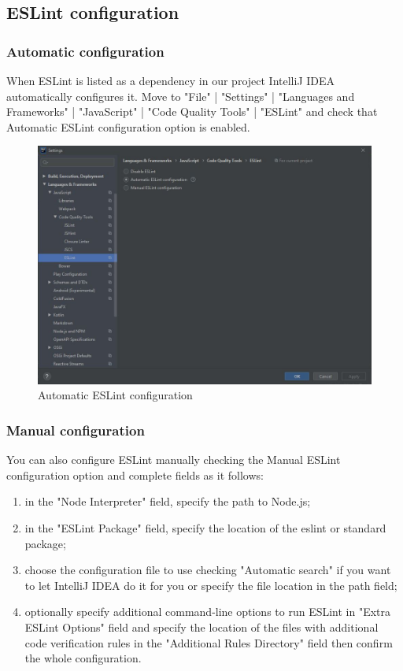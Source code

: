 	\subsection{ESLint configuration}
		\subsubsection{Automatic configuration}
When ESLint is listed as a dependency in our project IntelliJ IDEA automatically configures it. Move to "File" | "Settings" | "Languages and Frameworks" | "JavaScript" | "Code Quality Tools" | "ESLint" and check that Automatic ESLint configuration option is enabled. 


\begin{figure}[H]
		\centering
		\includegraphics[scale=0.60]{../Developer_manual/img/automatic_eslint_configuration.JPG}
		\caption{Automatic ESLint configuration}
	\end{figure}	

		\subsubsection{Manual configuration}
You can also configure ESLint manually checking the Manual ESLint configuration option and complete fields as it follows:
		\begin{enumerate}
			\item in the "Node Interpreter" field, specify the path to Node.js;
			\item in the "ESLint Package" field, specify the location of the eslint or standard package;
			\item choose the configuration file to use checking "Automatic search" if you want to let IntelliJ IDEA do it for you or specify the file location in the path field;
			\item optionally specify additional command-line options to run ESLint in "Extra ESLint Options" field and specify the location of the files with additional code verification rules in the "Additional Rules Directory" field then confirm the whole configuration.
		\end{enumerate}
		

